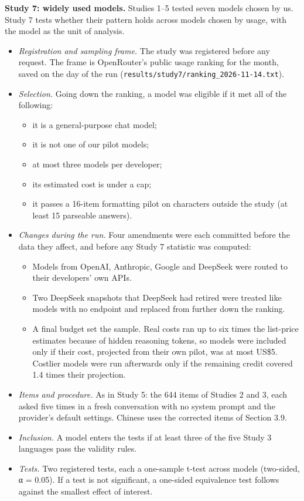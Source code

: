 \documentclass[
  11pt,
]{article}
\providecommand{\tightlist}{%
  \setlength{\itemsep}{0pt}\setlength{\parskip}{0pt}}
\begin{document}
\textbf{Study 7: widely used models.} Studies 1--5 tested seven models
chosen by us. Study 7 tests whether their pattern holds across models
chosen by usage, with the model as the unit of analysis.

\begin{itemize}
\tightlist
\item
  \emph{Registration and sampling frame.} The study was registered
  before any request. The frame is OpenRouter's public usage ranking for
  the month, saved on the day of the run
  (\texttt{results/study7/ranking\_2026-11-14.txt}).
\item
  \emph{Selection.} Going down the ranking, a model was eligible if it
  met all of the following:

  \begin{itemize}
  \tightlist
  \item
    it is a general-purpose chat model;
  \item
    it is not one of our pilot models;
  \item
    at most three models per developer;
  \item
    its estimated cost is under a cap;
  \item
    it passes a 16-item formatting pilot on characters outside the study
    (at least 15 parseable answers).
  \end{itemize}
\item
  \emph{Changes during the run.} Four amendments were each committed
  before the data they affect, and before any Study 7 statistic was
  computed:

  \begin{itemize}
  \tightlist
  \item
    Models from OpenAI, Anthropic, Google and DeepSeek were routed to
    their developers' own APIs.
  \item
    Two DeepSeek snapshots that DeepSeek had retired were treated like
    models with no endpoint and replaced from further down the ranking.
  \item
    A final budget set the sample. Real costs ran up to six times the
    list-price estimates because of hidden reasoning tokens, so models
    were included only if their cost, projected from their own pilot,
    was at most US\$5. Costlier models were run afterwards only if the
    remaining credit covered 1.4 times their projection.
  \end{itemize}
\item
  \emph{Items and procedure.} As in Study 5: the 644 items of Studies 2
  and 3, each asked five times in a fresh conversation with no system
  prompt and the provider's default settings. Chinese uses the corrected
  items of Section 3.9.
\item
  \emph{Inclusion.} A model enters the tests if at least three of the
  five Study 3 languages pass the validity rules.
\item
  \emph{Tests.} Two registered tests, each a one-sample t-test across
  models (two-sided, α = 0.05). If a test is not significant, a
  one-sided equivalence test follows against the smallest effect of
  interest.


\end{itemize}
\end{document}
